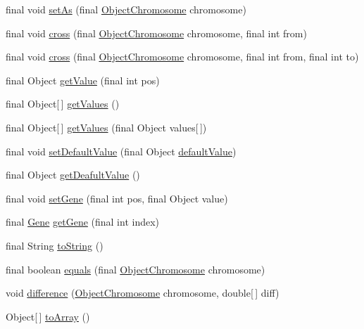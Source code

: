 \begin{DoxyCompactItemize}
\item 
final void \hyperlink{classjenes_1_1chromosome_1_1_object_chromosome_a77fd7d633e3663ea8fb63db2857bb1b7}{set\-As} (final \hyperlink{classjenes_1_1chromosome_1_1_object_chromosome}{Object\-Chromosome} chromosome)
\item 
final void \hyperlink{classjenes_1_1chromosome_1_1_object_chromosome_a8f0770f15071e71ee86d7ad43541118f}{cross} (final \hyperlink{classjenes_1_1chromosome_1_1_object_chromosome}{Object\-Chromosome} chromosome, final int from)
\item 
final void \hyperlink{classjenes_1_1chromosome_1_1_object_chromosome_a25225ffc89dae70e0b0ddeb21f8f125d}{cross} (final \hyperlink{classjenes_1_1chromosome_1_1_object_chromosome}{Object\-Chromosome} chromosome, final int from, final int to)
\item 
final Object \hyperlink{classjenes_1_1chromosome_1_1_object_chromosome_af221c16bbcd9f03867d2e4295216cc93}{get\-Value} (final int pos)
\item 
final Object\mbox{[}$\,$\mbox{]} \hyperlink{classjenes_1_1chromosome_1_1_object_chromosome_af41d722cff36fbb837c0038c885de04c}{get\-Values} ()
\item 
final Object\mbox{[}$\,$\mbox{]} \hyperlink{classjenes_1_1chromosome_1_1_object_chromosome_a7476459dce852e9a7fce5d35276817e8}{get\-Values} (final Object values\mbox{[}$\,$\mbox{]})
\item 
final void \hyperlink{classjenes_1_1chromosome_1_1_object_chromosome_a44d425a777314b8e9de58b680e686454}{set\-Default\-Value} (final Object \hyperlink{classjenes_1_1chromosome_1_1_object_chromosome_af5e2ac0b5272d948ec566f824baa3411}{default\-Value})
\item 
final Object \hyperlink{classjenes_1_1chromosome_1_1_object_chromosome_aea3da542f5b0d9c3300dc76cec3385f9}{get\-Deafult\-Value} ()
\item 
final void \hyperlink{classjenes_1_1chromosome_1_1_object_chromosome_ae68b9a0568dfc16f4f543438e54ac0ea}{set\-Gene} (final int pos, final Object value)
\item 
final \hyperlink{classjenes_1_1chromosome_1_1_object_chromosome_1_1_gene}{Gene} \hyperlink{classjenes_1_1chromosome_1_1_object_chromosome_abadaf50e19a5fd0ac5279de47914af99}{get\-Gene} (final int index)
\item 
final String \hyperlink{classjenes_1_1chromosome_1_1_object_chromosome_a660652ffc502cace60aceb16a5854de3}{to\-String} ()
\item 
final boolean \hyperlink{classjenes_1_1chromosome_1_1_object_chromosome_abeb710a44460d3699bf991590c41574a}{equals} (final \hyperlink{classjenes_1_1chromosome_1_1_object_chromosome}{Object\-Chromosome} chromosome)
\item 
void \hyperlink{classjenes_1_1chromosome_1_1_object_chromosome_a8afa1cbf1df7b9d65a9a8c34f476aa67}{difference} (\hyperlink{classjenes_1_1chromosome_1_1_object_chromosome}{Object\-Chromosome} chromosome, double\mbox{[}$\,$\mbox{]} diff)
\item 
Object\mbox{[}$\,$\mbox{]} \hyperlink{classjenes_1_1chromosome_1_1_object_chromosome_add9ff43a69d5991043baa4423877f255}{to\-Array} ()
\end{DoxyCompactItemize}
